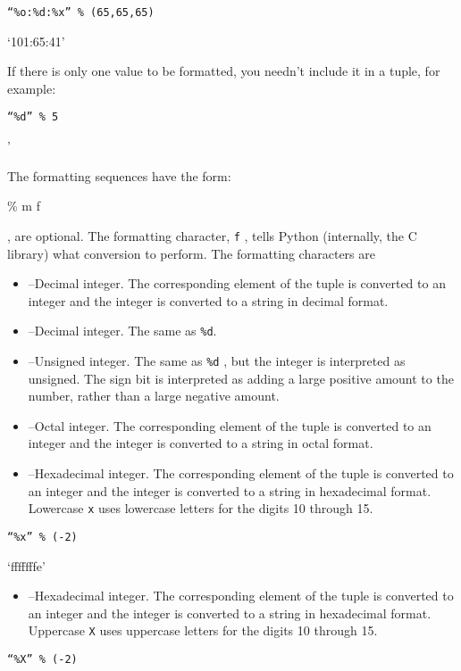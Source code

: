 \texttt{``\%o:\%d:\%x'' \% (65,65,65)}

`101:65:41'

If there is only one value to be
formatted, you needn't include it in a tuple, for example:


\texttt{``\textbar{}\%d\textbar{}'' \% 5}

'

The formatting sequences have the
form:

\% m f

 , are
optional. The formatting character, \texttt{f} , tells Python (internally,
the C library) what conversion to perform. The formatting characters are

\begin{itemize}

\item
   --Decimal integer. The
  corresponding element of the tuple is converted to an integer and the
  integer is converted to a string in decimal format.
\item
   --Decimal integer. The
  same as \texttt{\%d}.
\item
   --Unsigned integer. The
  same as \texttt{\%d} , but the integer is interpreted as unsigned. The
  sign bit is interpreted as adding a large positive amount to the
  number, rather than a large negative amount.
\item
   --Octal integer. The
  corresponding element of the tuple is converted to an integer and the
  integer is converted to a string in octal format.
\item
   --Hexadecimal integer.
  The corresponding element of the tuple is converted to an integer and
  the integer is converted to a string in hexadecimal format. Lowercase
  \texttt{x} uses lowercase letters for the digits 10 through 15.
\end{itemize}


\texttt{``\%x'' \% (-2)}

`fffffffe'

\begin{itemize}

\item
   --Hexadecimal integer.
  The corresponding element of the tuple is converted to an integer and
  the integer is converted to a string in hexadecimal format. Uppercase
  \texttt{X} uses uppercase letters for the digits 10 through 15.
\end{itemize}


\texttt{``\%X'' \% (-2)}

